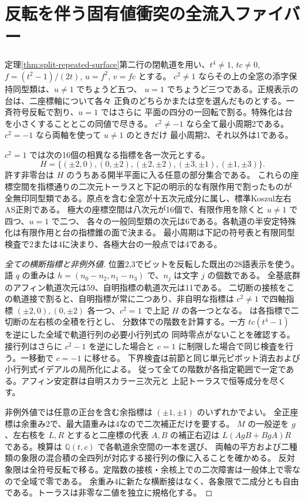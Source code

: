 \section{反転を伴う固有値衝突の全流入ファイバー}
\label{sec:reflected-collision-fibers}
\begin{theorem}\label{thm:reflected-collision-fibers}
定理\ref{thm:split-repeated-surface}第二行の閉軌道を用い、$t^4\ne1$, $t c\ne0$,
$f=(t^2-1)/(2t)$, $u=f^2$, $v=fc$ とする。
$c^2\ne1$ ならその上の全窓の添字保持同型類は、$u\ne1$ でちょうど五つ、
$u=1$ でちょうど三つである。正規表示の台は、二座標軸について各々
正負のどちらかまたは空を選んだものとする。一斉符号反転で割り、$u=1$ ではさらに
平面の四分の一回転で割る。特殊化は台を小さくすることとこの同値で尽きる。
$c^2\ne-1$ なら全て最小周期2である。$c^2=-1$ なら両軸を使って $u\ne1$ のときだけ
最小周期2、それ以外は1である。

$c^2=1$ では次の16個の相異なる指標を各一次元とする。
\[
 H=\{(\pm2,0),(0,\pm2),(\pm2,\pm2),(\pm3,\pm1),(\pm1,\pm3)\}.
\]
許す非零台は $H$ のうちある開半平面に入る任意の部分集合である。
これらの座標空間を指標通りの二次元トーラスと下記の明示的な有限作用で割ったものが
全無印同型類である。原点を含む全窓が十五次元成分に属し、標準Koszul左右AS正則である。
極大の座標空間は八次元が16個で、有限作用を除くと $u\ne1$ で四つ、$u=1$ で二つ、
各々の一般同型類の次元は6である。各軌道の半安定特殊化は有限作用と台の指標錐の面で決まる。
最小周期は下記の符号表と有限同型検査で2または4に決まり、各極大台の一般点では4である。
\end{theorem}
\begin{proof}[全ての横断指標と非例外値]
位置2,3でビットを反転した既出の28語表示を使う。語 $q$ の重みは
$h=(n_0-n_2,n_1-n_3)$ で、$n_j$ は文字 $j$ の個数である。
全基底群のアフィン軌道次元は59、自明指標の軌道次元は11である。
二切断の接核をこの軌道接で割ると、自明指標が常に二つあり、非自明な指標は
$c^2\ne1$ で四軸指標 $(\pm2,0),(0,\pm2)$ 各一つ、$c^2=1$ で上記 $H$ の各一つとなる。
 は各指標で二切断の左右核の全積を行とし、
分数体での階数を計算する。一方 $tc(t^4-1)$ を逆にした全域で軌道行列の必要小行列式の
同時零点がないことを確認する。接行列はさらに $c^2-1$ を逆にした場合と
$c=1$ に制限した場合で同じ検査を行う。一移動で $c=-1$ に移せる。
下界検査は前節と同じ単元ピボット消去および小行列式イデアルの局所化による。
従って全ての階数が各指定範囲で一定である。アフィン安定群は自明スカラー三次元と
上記トーラスで恒等成分を尽くす。

非例外値では任意の正台を含む余指標は $(\pm1,\pm1)$ のいずれかでよい。
全正座標は余重み2で、最大語重みは4なので二次補正だけを要する。
$M$ の一般逆を $g$、左右核を $L,R$ とすると二座標の代表 $A,B$ の補正右辺は
$L(AgB+BgA)R$ である。検算は $\mathbb Q(t,c)$ で各軌道余空間の一本を選び、
両軸の平方および二種類の象限の混合積の全四列が対応する接行列の像に入ることを確かめる。
反対象限は全符号反転で移る。定階数の接核・余核上での二次障害は一般体上で零なので全域で零である。
余重み4に新たな横断接はなく、各象限で二成分とも自由である。トーラスは非零な二値を独立に規格化する。
\end{proof}
